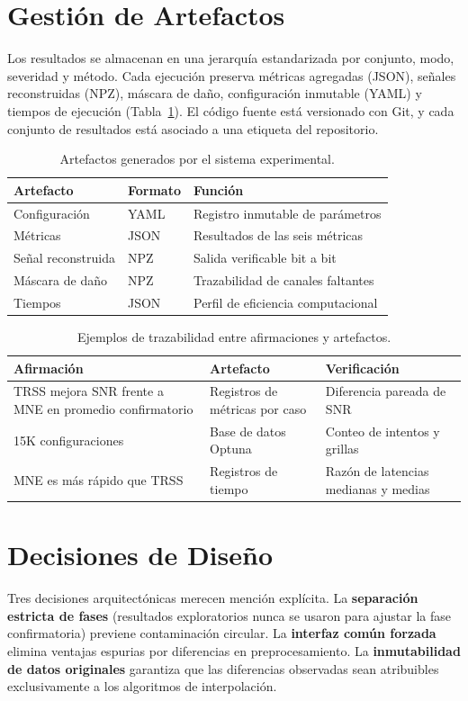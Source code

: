 \section{Gestión de Artefactos}

Los resultados se almacenan en una jerarquía estandarizada por conjunto, modo, severidad y método. Cada ejecución preserva métricas agregadas (JSON), señales reconstruidas (NPZ), máscara de daño, configuración inmutable (YAML) y tiempos de ejecución (Tabla~\ref{tab:artifact_types}). El código fuente está versionado con Git, y cada conjunto de resultados está asociado a una etiqueta del repositorio.

\begin{table}[htbp]
\centering
\caption{Artefactos generados por el sistema experimental.}
\label{tab:artifact_types}
\small
\begin{tabular}{@{}l l l@{}}
\toprule
Artefacto & Formato & Función \\
\midrule
Configuración & YAML & Registro inmutable de parámetros \\
Métricas & JSON & Resultados de las seis métricas \\
Señal reconstruida & NPZ & Salida verificable bit a bit \\
Máscara de daño & NPZ & Trazabilidad de canales faltantes \\
Tiempos & JSON & Perfil de eficiencia computacional \\
\bottomrule
\end{tabular}
\end{table}

\begin{table}[htbp]
\centering
\caption{Ejemplos de trazabilidad entre afirmaciones y artefactos.}
\label{tab:traceability}
\footnotesize
\begin{tabular}{@{}p{3.4cm}p{3.0cm}p{4.0cm}@{}}
\toprule
Afirmación & Artefacto & Verificación \\
\midrule
TRSS mejora SNR frente a MNE en promedio confirmatorio & Registros de métricas por caso & Diferencia pareada de SNR \\
15K configuraciones & Base de datos Optuna & Conteo de intentos y grillas \\
MNE es más rápido que TRSS & Registros de tiempo & Razón de latencias medianas y medias \\
\bottomrule
\end{tabular}
\end{table}

\section{Decisiones de Diseño}

Tres decisiones arquitectónicas merecen mención explícita. La \textbf{separación estricta de fases} (resultados exploratorios nunca se usaron para ajustar la fase confirmatoria) previene contaminación circular. La \textbf{interfaz común forzada} elimina ventajas espurias por diferencias en preprocesamiento. La \textbf{inmutabilidad de datos originales} garantiza que las diferencias observadas sean atribuibles exclusivamente a los algoritmos de interpolación.